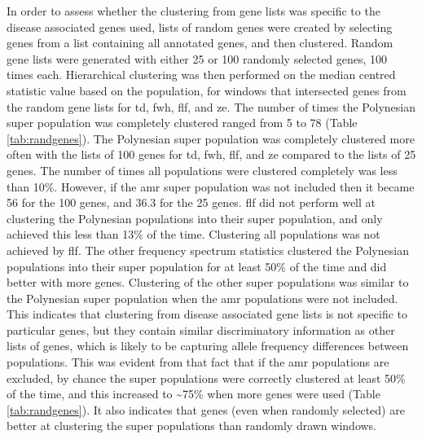 \documentclass[]{report}
\begin{document}
In order to assess whether the clustering from gene lists was specific
to the disease associated genes used, lists of random genes were created
by selecting genes from a list containing all annotated genes, and then
clustered. Random gene lists were generated with either 25 or 100
randomly selected genes, 100 times each. Hierarchical clustering was
then performed on the median centred statistic value based on the
population, for windows that intersected genes from the random gene
lists for \gls{td}, \gls{fwh}, \gls{flf}, and \gls{ze}. The number of
times the Polynesian super population was completely clustered ranged
from 5 to 78 (Table \ref{tab:randgenes}). The Polynesian super
population was completely clustered more often with the lists of 100
genes for \gls{td}, \gls{fwh}, \gls{flf}, and \gls{ze} compared to the
lists of 25 genes. The number of times all populations were clustered
completely was less than 10\%. However, if the \gls{amr} super
population was not included then it became 56 for the 100 genes, and
36.3 for the 25 genes. \gls{flf} did not perform well at clustering the
Polynesian populations into their super population, and only achieved
this less than 13\% of the time. Clustering all populations was not
achieved by \gls{flf}. The other frequency spectrum statistics clustered
the Polynesian populations into their super population for at least 50\%
of the time and did better with more genes. Clustering of the other
super populations was similar to the Polynesian super population when
the \gls{amr} populations were not included. This indicates that
clustering from disease associated gene lists is not specific to
particular genes, but they contain similar discriminatory information as
other lists of genes, which is likely to be capturing allele frequency
differences between populations. This was evident from that fact that if
the \gls{amr} populations are excluded, by chance the super populations
were correctly clustered at least 50\% of the time, and this increased
to \textasciitilde{}75\% when more genes were used (Table
\ref{tab:randgenes}). It also indicates that genes (even when randomly
selected) are better at clustering the super populations than randomly
drawn windows.
\end{document}

